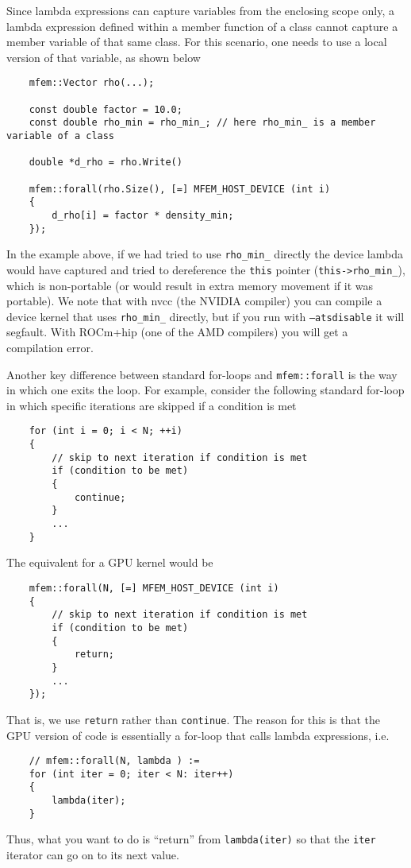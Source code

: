 \documentclass[a4paper,11pt]{article}
\begin{document}
Since lambda expressions can capture variables from the enclosing scope only, a lambda expression defined within a member function of a class cannot capture a member variable of that same class. For this scenario, one needs to use a local version of that variable, as shown below
\begin{lstlisting}
    mfem::Vector rho(...);

    const double factor = 10.0;
    const double rho_min = rho_min_; // here rho_min_ is a member variable of a class

    double *d_rho = rho.Write()

    mfem::forall(rho.Size(), [=] MFEM_HOST_DEVICE (int i) 
    {
        d_rho[i] = factor * density_min;
    });
\end{lstlisting}
In the example above, if we had tried to use \texttt{rho\_min\_} directly the device lambda would have captured and tried to dereference the \texttt{this} pointer (\texttt{this->rho\_min\_}), which is non-portable (or would result in extra memory movement if it was portable). We note that with nvcc (the NVIDIA compiler) you can compile a device kernel that uses \texttt{rho\_min\_} directly, but if you run with \texttt{--atsdisable} it will segfault. With ROCm+hip (one of the AMD compilers) you will get a compilation error.

Another key difference between standard for-loops and \texttt{mfem::forall} is the way in which one exits the loop. For example, consider the following standard for-loop in which specific iterations are skipped if a condition is met
\begin{lstlisting}
    for (int i = 0; i < N; ++i)
    {
        // skip to next iteration if condition is met
        if (condition to be met)
        {
            continue;
        }
        ...
    }
\end{lstlisting}
The equivalent for a GPU kernel would be
\begin{lstlisting}
    mfem::forall(N, [=] MFEM_HOST_DEVICE (int i) 
    {
        // skip to next iteration if condition is met
        if (condition to be met)
        {
            return;
        }
        ...
    });
\end{lstlisting}
That is, we use \texttt{return} rather than \texttt{continue}. The reason for this is that the GPU version of code is essentially a for-loop that calls lambda expressions, i.e.
\begin{lstlisting}
    // mfem::forall(N, lambda ) :=
    for (int iter = 0; iter < N: iter++)
    {
        lambda(iter);
    }
\end{lstlisting}
Thus, what you want to do is ``return'' from \texttt{lambda(iter)} so that the \texttt{iter} iterator can go on to its next value. 
\end{document}
